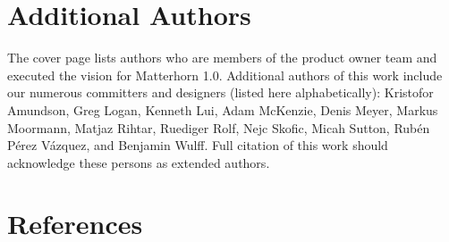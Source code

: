 \documentclass{sig-alternate}
\begin{document}


\appendix
\section{Additional Authors}
The cover page lists authors who are members of the product owner team and executed the vision for Matterhorn 1.0.  Additional authors of this work include our numerous committers and designers (listed here alphabetically): Kristofor Amundson, Greg Logan, Kenneth Lui, Adam McKenzie, Denis Meyer, Markus Moormann, Matjaz Rihtar, Ruediger Rolf, Nejc Skofic, Micah Sutton, Rub\'{e}n P\'{e}rez V\'{a}zquez, and Benjamin Wulff.  Full citation of this work should acknowledge these persons as extended authors.

\section{References}
\end{document}
